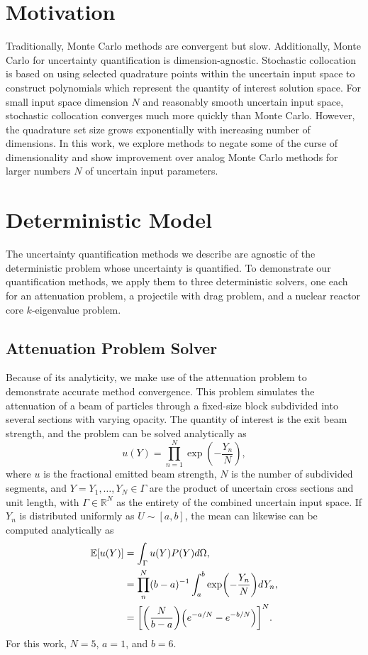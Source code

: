 \documentclass{mc2015}
\newcommand{\expv}[1]{\ensuremath{\mathbb{E}[ #1]}}
\begin{document}
\section{Motivation}
Traditionally, Monte Carlo methods are convergent but slow.  Additionally, Monte Carlo for uncertainty quantification is dimension-agnostic.  Stochastic collocation is based on using selected quadrature points within the uncertain input space to construct polynomials which represent the quantity of interest solution space. For small input space dimension $N$ and reasonably smooth uncertain input space, stochastic collocation converges much more quickly than Monte Carlo.  However, the quadrature set size grows exponentially with increasing number of dimensions.  In this work, we explore methods to negate some of the curse of dimensionality and show improvement over analog Monte Carlo methods for larger numbers $N$ of uncertain input parameters.

\section{Deterministic Model}
The uncertainty quantification methods we describe are agnostic of the deterministic problem whose uncertainty is quantified.  To demonstrate our quantification methods, we apply them to three deterministic solvers, one each for an attenuation problem, a projectile with drag problem, and a nuclear reactor core $k$-eigenvalue problem.

\subsection{Attenuation Problem Solver}
Because of its analyticity, we make use of the attenuation problem to demonstrate accurate method convergence.  This problem simulates the attenuation of a beam of particles through a fixed-size block subdivided into several sections with varying opacity.  The quantity of interest is the exit beam strength, and the problem can be solved analytically as
\begin{equation}
u(Y) = \prod_{n=1}^N \exp(-\frac{Y_n}{N}),
\end{equation}
where $u$ is the fractional emitted beam strength, $N$ is the number of subdivided segments, and $Y={Y_1,\ldots,Y_N}\in\Gamma$ are the product of uncertain cross sections and unit length, with $\Gamma\in\mathbb{R}^N$ as the entirety of the combined uncertain input space.  If $Y_n$ is distributed uniformly as $U\sim[a,b]$, the mean can likewise can be computed analytically as
\begin{align}
\expv{u(Y)}&=\int_\Gamma u(Y)P(Y) d\Omega,\\
    &=\prod_n^N (b-a)^{-1}\int_a^b \exp(-\frac{Y_n}{N}) dY_n,\\
    &=\qty[\qty(\frac{N}{b-a})\qty(e^{-a/N}-e^{-b/N})]^N.
\end{align}
For this work, $N=5$, $a=1$, and $b=6$.
\end{document}
